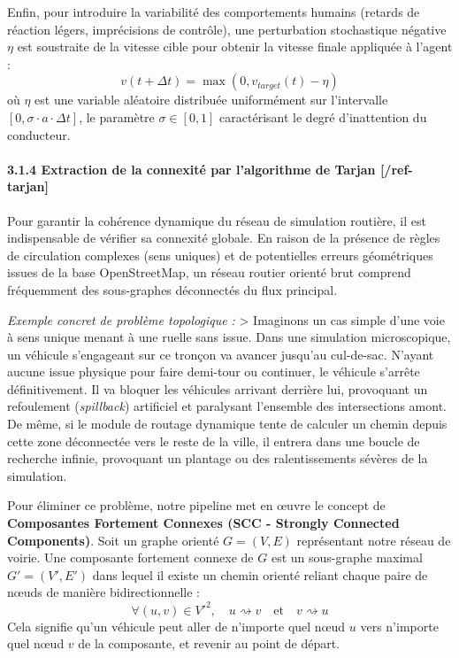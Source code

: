 \documentclass[10pt, a4paper]{article}
\begin{document}
Enfin, pour introduire la variabilité des comportements humains (retards
de réaction légers, imprécisions de contrôle), une perturbation
stochastique négative \(\eta\) est soustraite de la vitesse cible pour
obtenir la vitesse finale appliquée à l'agent :
\[v(t + \Delta t) = \max\left( 0, v_{target}(t) - \eta \right)\] où
\(\eta\) est une variable aléatoire distribuée uniformément sur
l'intervalle \([0, \sigma \cdot a \cdot \Delta t]\), le paramètre
\(\sigma \in [0, 1]\) caractérisant le degré d'inattention du
conducteur.

\paragraph{3.1.4 Extraction de la connexité par l'algorithme de Tarjan
{[}/ref-tarjan{]}}\label{extraction-de-la-connexituxe9-par-lalgorithme-de-tarjan-ref-tarjan}

Pour garantir la cohérence dynamique du réseau de simulation routière,
il est indispensable de vérifier sa connexité globale. En raison de la
présence de règles de circulation complexes (sens uniques) et de
potentielles erreurs géométriques issues de la base OpenStreetMap, un
réseau routier orienté brut comprend fréquemment des sous-graphes
déconnectés du flux principal.

\emph{Exemple concret de problème topologique :} \textgreater{}
Imaginons un cas simple d'une voie à sens unique menant à une ruelle
sans issue. Dans une simulation microscopique, un véhicule s'engageant
sur ce tronçon va avancer jusqu'au cul-de-sac. N'ayant aucune issue
physique pour faire demi-tour ou continuer, le véhicule s'arrête
définitivement. Il va bloquer les véhicules arrivant derrière lui,
provoquant un refoulement (\emph{spillback}) artificiel et paralysant
l'ensemble des intersections amont. De même, si le module de routage
dynamique tente de calculer un chemin depuis cette zone déconnectée vers
le reste de la ville, il entrera dans une boucle de recherche infinie,
provoquant un plantage ou des ralentissements sévères de la simulation.

Pour éliminer ce problème, notre pipeline met en œuvre le concept de
\textbf{Composantes Fortement Connexes (SCC - Strongly Connected
Components)}. Soit un graphe orienté \(G = (V, E)\) représentant notre
réseau de voirie. Une composante fortement connexe de \(G\) est un
sous-graphe maximal \(G' = (V', E')\) dans lequel il existe un chemin
orienté reliant chaque paire de nœuds de manière bidirectionnelle :
\[\forall (u, v) \in V'^2, \quad u \rightsquigarrow v \quad \text{et} \quad v \rightsquigarrow u\]
Cela signifie qu'un véhicule peut aller de n'importe quel nœud \(u\)
vers n'importe quel nœud \(v\) de la composante, et revenir au point de
départ.
\end{document}
